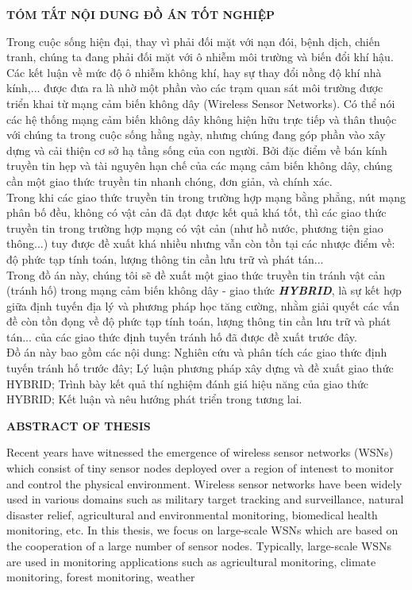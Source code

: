 \documentclass[12pt]{report}
\begin{document}
\newpage
\begin{center}
\large \textbf{TÓM TẮT NỘI DUNG ĐỒ ÁN TỐT NGHIỆP}\end{center}
Trong cuộc sống hiện đại, thay vì phải đối mặt với nạn đói, bệnh dịch, chiến tranh, chúng ta đang phải đối mặt với ô nhiễm môi trường và biến đổi khí hậu. Các kết luận về mức độ ô nhiễm không khí, hay sự thay đổi nồng độ khí nhà kính,... được đưa ra là nhờ một phần vào các trạm quan sát môi trường được triển khai từ mạng cảm biến không dây (Wireless Sensor Networks). Có thể nói các hệ thống mạng cảm biến không dây không hiện hữu trực tiếp và thân thuộc với chúng ta trong cuộc sống hằng ngày, nhưng chúng đang góp phần vào xây dựng và cải thiện cơ sở hạ tầng sống của con người. Bởi đặc điểm về bán kính truyền tin hẹp và tài nguyên hạn chế của các mạng cảm biến không dây, chúng cần một giao thức truyền tin nhanh chóng, đơn giản, và chính xác.\\
Trong khi các giao thức truyền tin trong trường hợp mạng bằng phẳng, nút mạng phân bố đều, không có vật cản đã đạt được kết quả khá tốt, thì các giao thức truyền tin trong trường hợp mạng có vật cản (như hồ nước, phương tiện giao thông...) tuy được đề xuất khá nhiều nhưng vẫn còn tồn tại các nhược điểm về: độ phức tạp tính toán, lượng thông tin cần lưu trữ và phát tán...\\
Trong đồ án này, chúng tôi sẽ đề xuất một giao thức truyền tin tránh vật cản (tránh hố) trong mạng cảm biến không dây - giao thức \textbf{\textit{HYBRID}}, là sự kết hợp giữa định tuyến địa lý và phương pháp học tăng cường, nhằm giải quyết các vấn đề còn tồn đọng về độ phức tạp tính toán, lượng thông tin cần lưu trữ và phát tán... của các giao thức định tuyến tránh hố đã được đề xuất trước đây.\\
Đồ án này bao gồm các nội dung: Nghiên cứu và phân tích các giao thức định tuyến tránh hố trước đây; Lý luận phương pháp xây dựng và đề xuất giao thức HYBRID; Trình bày kết quả thí nghiệm đánh giá hiệu năng của giao thức HYBRID; Kết luận và nêu hướng phát triển trong tương lai.
\newpage
\begin{center}
\large \textbf{ABSTRACT OF THESIS}
\end{center}
Recent years have witnessed the emergence of wireless sensor networks (WSNs) which
consist of tiny sensor nodes deployed over a region of intenest to monitor and control
the physical environment. Wireless sensor networks have been widely used in various
domains such as military target tracking and surveillance, natural disaster relief, agricultural and environmental monitoring, biomedical health monitoring, etc. In this thesis, we focus on large-scale WSNs which are based on the cooperation of a large number of sensor nodes. Typically, large-scale WSNs are used in monitoring applications such as agricultural monitoring, climate monitoring, forest monitoring, weather
\end{document}
